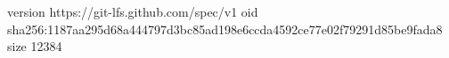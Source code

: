 version https://git-lfs.github.com/spec/v1
oid sha256:1187aa295d68a444797d3bc85ad198e6ccda4592ce77e02f79291d85be9fada8
size 12384
